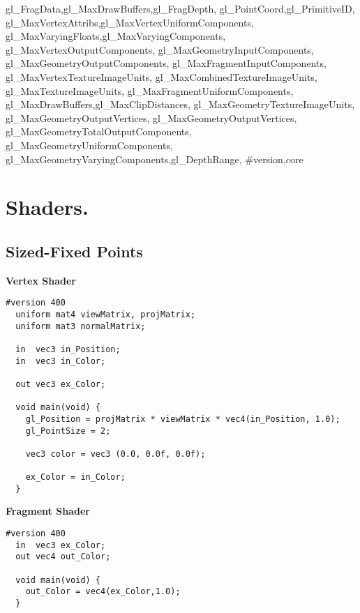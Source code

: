 {{    gl_FragData,gl_MaxDrawBuffers,gl_FragDepth,
    gl_PointCoord,gl_PrimitiveID,
    gl_MaxVertexAttribs,gl_MaxVertexUniformComponents,
    gl_MaxVaryingFloats,gl_MaxVaryingComponents,
    gl_MaxVertexOutputComponents,
    gl_MaxGeometryInputComponents,
    gl_MaxGeometryOutputComponents,
    gl_MaxFragmentInputComponents,
    gl_MaxVertexTextureImageUnits,
    gl_MaxCombinedTextureImageUnits,
    gl_MaxTextureImageUnits,
    gl_MaxFragmentUniformComponents,
    gl_MaxDrawBuffers,gl_MaxClipDistances,
    gl_MaxGeometryTextureImageUnits,
    gl_MaxGeometryOutputVertices,
    gl_MaxGeometryOutputVertices,
    gl_MaxGeometryTotalOutputComponents,
    gl_MaxGeometryUniformComponents,
    gl_MaxGeometryVaryingComponents,gl_DepthRange,
    \#version,core
  }
}

\chapter[Shaders]{Shaders.}

\section{Sized-Fixed Points \label{sized-fixed}}

\textbf{Vertex Shader}
\begin{lstlisting}[frame=single]
  #version 400
  uniform mat4 viewMatrix, projMatrix;
  uniform mat3 normalMatrix;

  in  vec3 in_Position;
  in  vec3 in_Color;

  out vec3 ex_Color;

  void main(void) {
    gl_Position = projMatrix * viewMatrix * vec4(in_Position, 1.0);
    gl_PointSize = 2;

    vec3 color = vec3 (0.0, 0.0f, 0.0f);

    ex_Color = in_Color;
  }
\end{lstlisting}

\textbf{Fragment Shader}
\begin{lstlisting}[frame=single]
  #version 400
  in  vec3 ex_Color;
  out vec4 out_Color;

  void main(void) {
    out_Color = vec4(ex_Color,1.0);
  }
\end{lstlisting}


